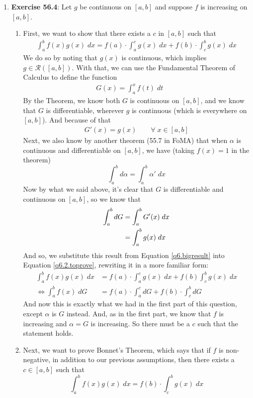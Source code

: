 \documentclass[12pt]{article}
\theoremstyle{plain}
\theoremstyle{definition}
\theoremstyle{remark}
\begin{document}
\begin{enumerate}
\begin{enumerate}
\item 
\textbf{Exercise 56.4}: Let $g$ be continuous on $[a,b]$ and suppose $f$ is increasing on $[a,b]$.
\begin{enumerate}
\item First, we want to show that there exists a $c$ in $[a,b]$ such that 
\begin{align}
    \label{q6.2.toprove}
    \int^b_a f(x)g(x)\;dx = f(a) \cdot \int^c_a g(x)\;dx
        + f(b) \cdot \int^b_c g(x)\;dx
\end{align}
We do so by noting that $g(x)$ is continuous, which implies $g\in\mathscr{R}([a,b])$. With that, we can use the Fundamental Theorem of Calculus to define the function
\begin{align*}
    G(x) = \int^x_a f(t)\;dt \qquad
\end{align*}
By the Theorem, we know both $G$ is continuous on $[a,b]$, and we know that $G$ is differentiable, wherever $g$ is continuous (which is everywhere on $[a,b]$). And because of that 
\begin{align*}
    G'(x) = g(x) \qquad \forall \; x\in[a,b] 
\end{align*}
Next, we also know by another theorem (55.7 in FoMA) that when $\alpha$ is continuous and differentiable on $[a,b]$, we have (taking $f(x)=1$ in the theorem)
\[ 
    \int^b_a d\alpha = \int^b_a \alpha' \; dx 
\]
Now by what we said above, it's clear that $G$ is differentiable and continuous on $[a,b]$, so we know that 
\begin{align}
    \int^b_a dG &= \int^b_a G'(x) \;dx\notag\\
    &= \int^b_a g(x) \;dx
    \label{q6.bigresult}
\end{align}
And so, we substitute this result from Equation \ref{q6.bigresult} into Equation \ref{q6.2.toprove}, rewriting it in a more familiar form:
\begin{align*}
    \int^b_a f(x)g(x)\;dx &= f(a) \cdot \int^c_a g(x)\;dx
        + f(b) \int^b_c g(x)\;dx\\
    \Leftrightarrow
    \int^b_a f(x)\;dG 
    &= f(a) \cdot \int^c_a dG
        + f(b) \cdot \int^b_c dG
\end{align*}
And now this is exactly what we had in the first part of this question, except $\alpha$ is $G$ instead. And, as in the first part, we know that $f$ is increasing and $\alpha=G$ is increasing.  So there must be a $c$ such that the statement holds.

\item Next, we want to prove Bonnet's Theorem, which says that if $f$ is non-negative, in addition to our previous assumptions, then there exists a $c\in[a,b]$ such that
\[
    \int^b_a f(x)g(x)\;dx = f(b)\cdot\int^b_c g(x)\;dx
\]
    

\end{enumerate}
\end{enumerate}
\end{enumerate}
\end{document}
